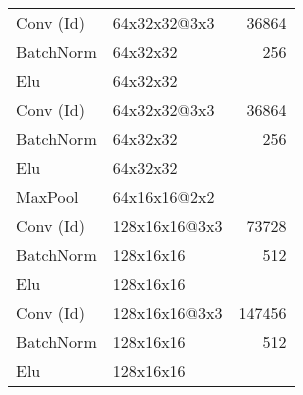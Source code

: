 \begin{table}[htp]
{\begin{tabular}{llr}
	Conv (Id)            & 64x32x32@3x3    & 36864           \\ 
	BatchNorm            & 64x32x32        & 256             \\ 
	Elu                  & 64x32x32        &                 \\ 
	Conv (Id)            & 64x32x32@3x3    & 36864           \\ 
	BatchNorm            & 64x32x32        & 256             \\ 
	Elu                  & 64x32x32        &                 \\ 
	MaxPool              & 64x16x16@2x2    &                 \\ 
	Conv (Id)            & 128x16x16@3x3   & 73728           \\ 
	BatchNorm            & 128x16x16       & 512             \\ 
	Elu                  & 128x16x16       &                 \\ 
	Conv (Id)            & 128x16x16@3x3   & 147456          \\ 
	BatchNorm            & 128x16x16       & 512             \\ 
	Elu                  & 128x16x16       &                 \\
\end{tabular}%
\begin{tabular}{llr}
 

\end{tabular}}
\end{table}
